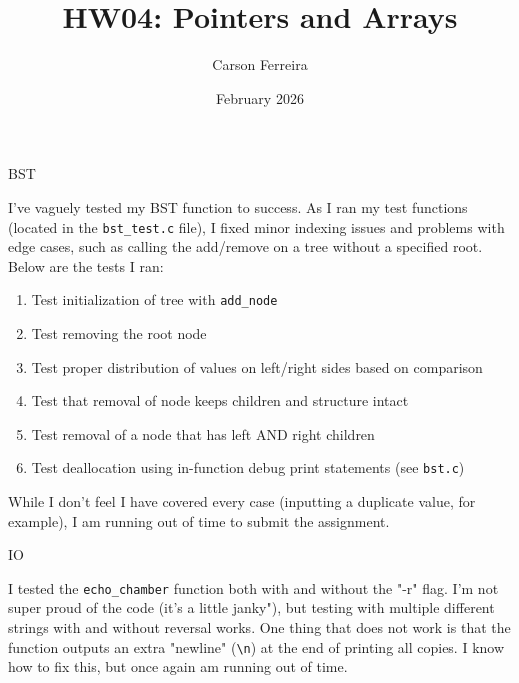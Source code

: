 \documentclass[answers]{exam}
\title{HW04: Pointers and Arrays}
\author{Carson Ferreira}
\date{February 2026}
\begin{document}
\maketitle

\begin{questions}
   \question BST
   \begin{solution}
      I've vaguely tested my BST function to success. As I ran my test functions
      (located in the \verb|bst_test.c| file), I fixed minor indexing
      issues and problems with edge cases, such as calling the add/remove
      on a tree without a specified root. Below are the tests I ran:
      \begin{enumerate}
         \item Test initialization of tree with \verb|add_node|
         \item Test removing the root node
         \item Test proper distribution of values on left/right sides based on comparison
         \item Test that removal of node keeps children and structure intact
         \item Test removal of a node that has left AND right children
         \item Test deallocation using in-function debug print statements (see \verb|bst.c|)
      \end{enumerate} 
      While I don't feel I have covered every case (inputting a duplicate value, for example),
      I am running out of time to submit the assignment.
   \end{solution}
   \question IO
   \begin{solution}
      I tested the \verb|echo_chamber| function both with and without the "-r" flag.
      I'm not super proud of the code (it's a little janky"), but testing with multiple
      different strings with and without reversal works. One thing that does not work is
      that the function outputs an extra "newline" (\verb|\n|) at the end of printing all
      copies. I know how to fix this, but once again am running out of time.
   \end{solution}
\end{questions}
\end{document}
